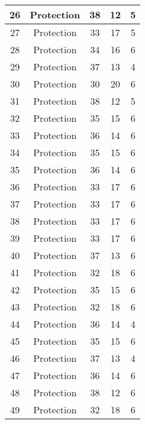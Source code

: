 \documentclass[results.tex]{subfiles}
\begin{document}
\begin{center}
\begin{tabular}{| c || c | c | c | c |}
    \hline
    26 & Protection & 38 & 12 & 5 \\ 
    \hline
    27 & Protection & 33 & 17 & 5 \\ 
    \hline
    28 & Protection & 34 & 16 & 6 \\ 
    \hline
    29 & Protection & 37 & 13 & 4 \\ 
    \hline
    30 & Protection & 30 & 20 & 6 \\ 
    \hline
    31 & Protection & 38 & 12 & 5 \\ 
    \hline
    32 & Protection & 35 & 15 & 6 \\ 
    \hline
    33 & Protection & 36 & 14 & 6 \\ 
    \hline
    34 & Protection & 35 & 15 & 6 \\ 
    \hline
    35 & Protection & 36 & 14 & 6 \\ 
    \hline
    36 & Protection & 33 & 17 & 6 \\ 
    \hline
    37 & Protection & 33 & 17 & 6 \\ 
    \hline
    38 & Protection & 33 & 17 & 6 \\ 
    \hline
    39 & Protection & 33 & 17 & 6 \\ 
    \hline
    40 & Protection & 37 & 13 & 6 \\ 
    \hline
    41 & Protection & 32 & 18 & 6 \\ 
    \hline
    42 & Protection & 35 & 15 & 6 \\ 
    \hline
    43 & Protection & 32 & 18 & 6 \\ 
    \hline
    44 & Protection & 36 & 14 & 4 \\ 
    \hline
    45 & Protection & 35 & 15 & 6 \\ 
    \hline
    46 & Protection & 37 & 13 & 4 \\ 
    \hline
    47 & Protection & 36 & 14 & 6 \\ 
    \hline
    48 & Protection & 38 & 12 & 6 \\ 
    \hline
    49 & Protection & 32 & 18 & 6 \\ 
    \hline   \end{tabular}
\end{center}
\end{document}
